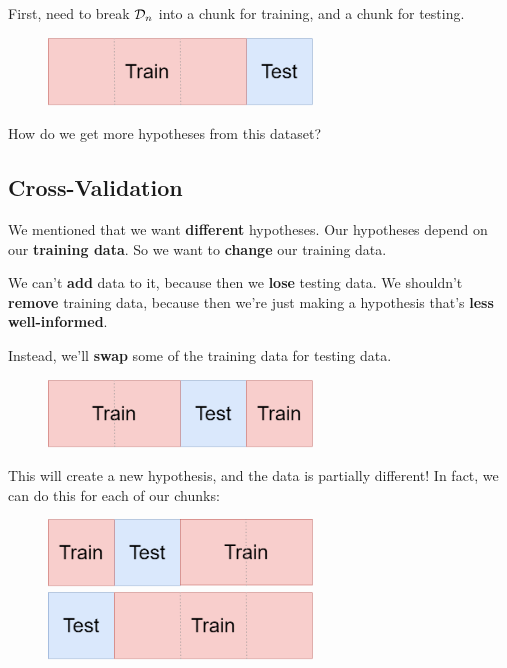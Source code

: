         First, need to break ${\cal D}_n$ into a chunk for training, and a chunk for testing.
        
        \begin{figure}[H]
        \centering
            \includegraphics[width=70mm,scale=0.5]{images/regression_images/training_and_test_data.png}
        \end{figure}
        
        How do we get more hypotheses from this dataset?
        
    \subsection{Cross-Validation}
    
        We mentioned that we want \textbf{different} hypotheses. Our hypotheses depend on our \textbf{training data}. So we want to \textbf{change} our training data.
        
        We can't \textbf{add} data to it, because then we \textbf{lose} testing data. We shouldn't \textbf{remove} training data, because then we're just making a hypothesis that's \textbf{less well-informed}.
        
        Instead, we'll \textbf{swap} some of the training data for testing data.
        
        \begin{figure}[H]
        \centering
            \includegraphics[width=70mm,scale=0.5]{images/regression_images/training_and_test_data_2.png}
        \end{figure}
        
        This will create a new hypothesis, and the data is partially different! In fact, we can do this for each of our chunks:
        
        \begin{figure}[H]
                \includegraphics[width=70mm,scale=0.5]{images/regression_images/training_and_test_data_3.png}
                
                \includegraphics[width=70mm,scale=0.5]{images/regression_images/training_and_test_data_4.png}
            
        \end{figure}
        
